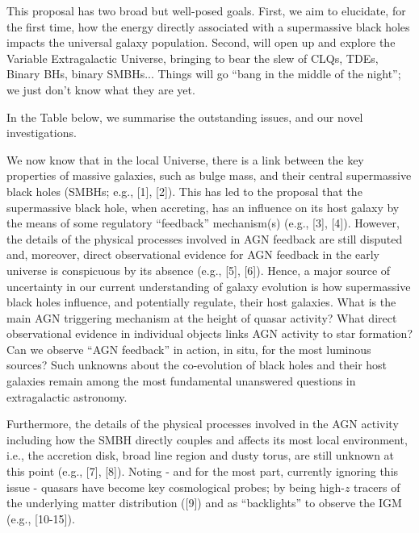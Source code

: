 \smallskip
\smallskip
\noindent
This proposal has two broad but well-posed goals. 
First, we aim to elucidate, for the first time, how the energy directly associated with a 
supermassive black holes impacts the universal galaxy population.  
Second, will open up and explore the Variable Extragalactic Universe, bringing to bear 
the slew of 
CLQs, TDEs, Binary BHs, binary SMBHs... 
Things will go ``bang in the middle of the night''; we just don't know what 
they are yet. 

%

\smallskip
\smallskip
\noindent
In the Table below, we summarise the outstanding issues, and our novel investigations. 

\smallskip 
\smallskip
\noindent
We now know that in the local Universe, there is a link between the
key properties of massive galaxies, such as bulge mass, and their
central supermassive black holes (SMBHs; e.g., [1], [2]). This has led
to the proposal that the supermassive black hole, when accreting, has
an influence on its host galaxy by the means of some regulatory
``feedback'' mechanism(s) (e.g., [3], [4]). However, the details of
the physical processes involved in AGN feedback are still disputed
and, moreover, direct observational evidence for AGN feedback in the
early universe is conspicuous by its absence (e.g., [5], [6]). Hence,
a major source of uncertainty in our current understanding of galaxy
evolution is how supermassive black holes influence, and potentially
regulate, their host galaxies.
What is the main AGN triggering mechanism at the height of quasar
activity? What direct observational evidence in individual objects
links AGN activity to star formation?  Can we observe ``AGN feedback''
in action, in situ, for the most luminous sources?  Such unknowns
about the co-evolution of black holes and their host galaxies remain
among the most fundamental unanswered questions in extragalactic
astronomy.




\smallskip 
\smallskip
\noindent
Furthermore, the details of the physical processes involved in the AGN
activity including how the SMBH directly couples and affects its most
local environment, i.e., the accretion disk, broad line region and
dusty torus, are still unknown at this point (e.g., [7], [8]). Noting
- and for the most part, currently ignoring this issue - quasars have
become key cosmological probes; by being high-$z$ tracers of the
underlying matter distribution ([9]) and as ``backlights'' to observe
the IGM (e.g., [10-15]).

